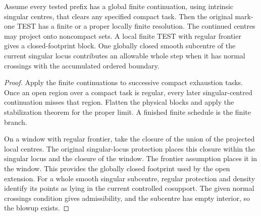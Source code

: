 \begin{theorem}
\label{hir:g8-global-native-test-tails}
\leanok
Assume every tested prefix has a global finite continuation,
using intrinsic singular centres, that clears any specified compact
task. Then the original mark-one TEST has a finite or a proper
locally finite resolution. The continued centres may project onto
noncompact sets. A local finite TEST with regular frontier gives
a closed-footprint block. One globally closed smooth subcentre
of the current singular locus contributes an allowable whole step
when it has normal crossings with the accumulated ordered boundary.
\end{theorem}
\begin{proof}
Apply the finite continuations to successive compact exhaustion
tasks. Once an open region over a compact task is regular, every
later singular-centred continuation misses that region. Flatten
the physical blocks and apply the stabilization theorem for the
proper limit. A finished finite schedule is the finite branch.

On a window with regular frontier, take the closure of the union
of the projected local centres. The original singular-locus
protection places this closure within the singular locus and the
closure of the window. The frontier assumption places it in the
window. This provides the globally closed footprint used by the
open extension. For a whole smooth singular subcentre, regular
protection and density identify its points as lying in the
current controlled cosupport. The given normal crossings
condition gives admissibility, and the subcentre has empty
interior, so the blowup exists.
\end{proof}

